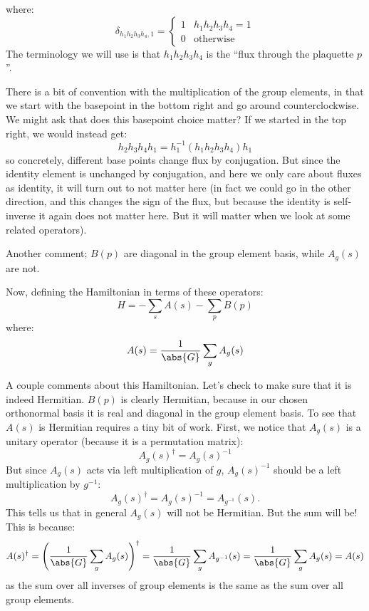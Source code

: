 where:
\begin{equation}
    \delta_{h_1h_2h_3h_4, 1} = \begin{cases}
        1 & h_1h_2h_3h_4 = 1
        \\ 0 & \text{otherwise}
    \end{cases}
\end{equation}
The terminology we will use is that $h_1h_2h_3h_4$ is the ``flux through the plaquette $p$''.

There is a bit of convention with the multiplication of the group elements, in that we start with the basepoint in the bottom right and go around counterclockwise. We might ask that does this basepoint choice matter? If we started in the top right, we would instead get:
\begin{equation}
    h_2h_3h_4h_1 = h_1^{-1}(h_1h_2h_3h_4)h_1
\end{equation}
so concretely, different base points change flux by conjugation. But since the identity element is unchanged by conjugation, and here we only care about fluxes as identity, it will turn out to not matter here (in fact we could go in the other direction, and this changes the sign of the flux, but because the identity is self-inverse it again does not matter here. But it will matter when we look at some related operators).

Another comment; $B(p)$ are diagonal in the group element basis, while $A_g(s)$ are not. 

Now, defining the Hamiltonian in terms of these operators:
\begin{equation}
    H = - \sum_s A(s) - \sum_p B(p)
\end{equation}
where:
\begin{equation}
    A(s) = \frac{1}{\abs{G}}\sum_g A_g(s)
\end{equation}

A couple comments about this Hamiltonian. Let's check to make sure that it is indeed Hermitian. $B(p)$ is clearly Hermitian, because in our chosen orthonormal basis it is real and diagonal in the group element basis. To see that $A(s)$ is Hermitian requires a tiny bit of work. First, we notice that $A_g(s)$ is a unitary operator (because it is a permutation matrix):
\begin{equation}
    A_g(s)^\dag = A_g(s)^{-1}
\end{equation}
But since $A_g(s)$ acts via left multiplication of $g$, $A_g(s)^{-1}$ should be a left multiplication by $g^{-1}$:
\begin{equation}
    A_g(s)^\dag = A_{g}(s)^{-1} = A_{g^{-1}}(s).
\end{equation}
This tells us that in general $A_g(s)$ will not be Hermitian. But the sum will be! This is because:
\begin{equation}
    A(s)^\dag = \left(\frac{1}{\abs{G}}\sum_g A_g(s)\right)^\dag = \frac{1}{\abs{G}}\sum_{g}A_{g^{-1}}(s) = \frac{1}{\abs{G}}\sum_g A_g(s) = A(s)
\end{equation}
as the sum over all inverses of group elements is the same as the sum over all group elements.


